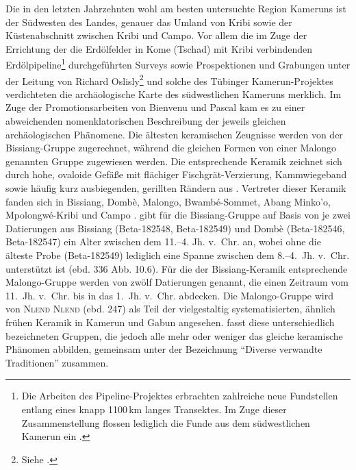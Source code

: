 Die in den letzten Jahrzehnten wohl am besten untersuchte Region Kameruns ist der Südwesten des Landes, genauer das Umland von Kribi sowie der Küstenabschnitt zwischen Kribi und Campo. Vor allem die im Zuge der Errichtung der die Erdölfelder in Kome (Tschad) mit Kribi verbindenden Erdölpipeline\footnote{Die Arbeiten des Pipeline-Projektes erbrachten zahlreiche neue Fundstellen entlang eines knapp 1100\,km langes Transektes. Im Zuge dieser Zusammenstellung flossen lediglich die Funde aus dem südwestlichen Kamerun ein \parencites[siehe][]{Lavachery.2005}{Lavachery.2010}.} durchgeführten Surveys sowie Prospektionen und Grabungen unter der Leitung von Richard Oslisly\footnote{Siehe \textcites{Oslisly.2006}{Oslisly.2006d}.} und solche des Tübinger Kamerun-Projektes \parencites{Eggert.2006b}{Meister.2008b} verdichteten die archäologische Karte des südwestlichen Kameruns merklich. Im Zuge der Promotionsarbeiten von Bienvenu \textcite{GouemGouem.20102011} und Pascal \textcite{NlendNlend.20132014} kam es zu einer abweichenden nomenklatorischen Beschreibung der jeweils gleichen archäologischen Phänomene. Die ältesten keramischen Zeugnisse werden von \textcite[330--341]{GouemGouem.20102011} der Bissiang-Gruppe zugerechnet, während die gleichen Formen von \textcite[233--249]{NlendNlend.20132014} einer Malongo genannten Gruppe zugewiesen werden. Die entsprechende Keramik zeichnet sich durch hohe, ovaloide Gefäße mit flächiger Fischgrät-Verzierung, Kammwiegeband sowie häufig kurz ausbiegenden, gerillten Rändern aus \parencites[337 Abb.~11.6]{GouemGouem.20102011}[237--239 Abb.~102--104; Abb.~\ref{fig:swCameroon_Sequence}.5--7]{NlendNlend.20132014}. Vertreter dieser Keramik fanden sich in Bissiang, Dombè, Malongo, Bwambé-Sommet, Abang Minko'o, Mpolongwé-Kribi und Campo \parencites[336, 339 Karte 1.6]{GouemGouem.20102011}[254]{NlendNlend.20132014}{Seidensticker.2010b}. \textcite[336 Abb. 10.6]{GouemGouem.20102011} gibt für die Bissiang-Gruppe auf Basis von je zwei Datierungen aus Bissiang (Beta-182548, Beta-182549) und Dombè (Beta-182546, Beta-182547) ein Alter zwischen dem 11.--4. Jh. v.~Chr. an, wobei ohne die älteste Probe (Beta-182549) lediglich eine Spanne zwischen dem \mbox{8.--4. Jh.} v.~Chr. unterstützt ist (ebd. 336 Abb. 10.6). Für die der Bissiang-Keramik entsprechende Malongo-Gruppe werden von \textcite[255 Abb.~116]{NlendNlend.20132014} zwölf Datierungen genannt, die einen Zeitraum vom 11.~Jh. v.~Chr. bis in das 1.~Jh. v.~Chr. abdecken. Die Malongo-Gruppe wird von \textsc{Nlend Nlend} (ebd. 247) als Teil der vielgestaltig systematisierten, ähnlich frühen Keramik in Kamerun und Gabun angesehen. \textcite[632 Abb.~43.3]{deMaret.2013} fasst diese unterschiedlich bezeichneten Gruppen, die jedoch alle mehr oder weniger das gleiche keramische Phänomen abbilden, gemeinsam unter der Bezeichnung \enquote{Diverse verwandte Traditionen} zusammen.

